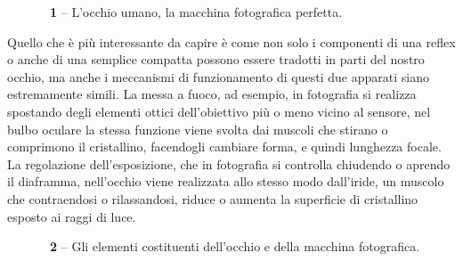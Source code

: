 \begin{figure}[!b]
\begin{center}
\caption{\textbf{\figurename~1} -- L'occhio umano, la macchina fotografica perfetta.}
\label{fig:occhio}
\end{center}
\vskip-20pt
\end{figure}

Quello che è più interessante da capire è come non solo i componenti di una reflex o anche di una semplice compatta  possono essere tradotti in parti del nostro occhio, ma anche i meccanismi di funzionamento di questi due apparati siano estremamente simili.
La messa a fuoco, ad esempio, in fotografia si realizza spostando degli elementi ottici dell'obiettivo più o meno vicino al sensore, nel bulbo oculare la stessa funzione viene svolta dai muscoli che stirano o comprimono il cristallino, facendogli cambiare forma, e quindi lunghezza focale. 
La regolazione dell'esposizione, che in fotografia si controlla chiudendo o aprendo il diaframma, nell'occhio viene realizzata allo stesso modo dall'iride, un muscolo che contraendosi o rilassandosi, riduce o aumenta la superficie di cristallino esposto ai raggi di luce.

\begin{figure}[!t]
\begin{center}
\caption{\textbf{\figurename~2} -- Gli elementi costituenti dell'occhio e della macchina fotografica.}
\label{fig:setup}
\end{center}
\vskip-20pt
\end{figure}

